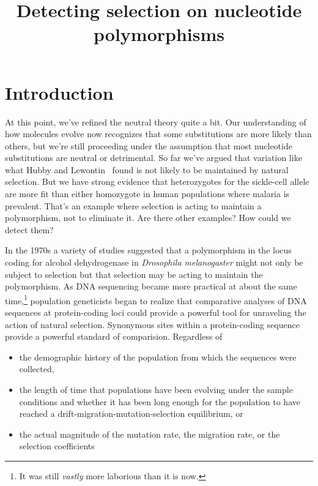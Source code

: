 \documentclass[12pt]{article}
\title{Detecting selection on nucleotide polymorphisms}
\begin{document}
\maketitle

\thispagestyle{first}

\section*{Introduction}

At this point, we've refined the neutral theory quite a bit. Our
understanding of how molecules evolve now recognizes that some
substitutions are more likely than others, but we're still proceeding
under the assumption that most nucleotide substitutions are neutral or
detrimental. So far we've argued that variation like what Hubby and
Lewontin~\cite{Hubby-Lewontin66,Lewontin-Hubby66} found is not likely
to be maintained by natural selection. But we have strong evidence
that heterozygotes for the sickle-cell allele are more fit than either
homozygote in human populations where malaria is prevalent. That's an
example where selection is acting to maintain a polymorphism, not to
eliminate it. Are there other examples? How could we detect them?

In the 1970s a variety of studies suggested that a polymorphism in the
locus coding for alcohol dehydrogenase in {\it Drosophila
  melanogaster\/} might not only be subject to selection but that
selection may be acting to maintain the polymorphism. As DNA
sequencing became more practical at about the same time,\footnote{It
  was still {\it vastly\/} more laborious than it is now.} population
geneticists began to realize that comparative analyses of DNA
sequences at protein-coding loci could provide a powerful tool for
unraveling the action of natural selection. Synonymous sites within a
protein-coding sequence provide a powerful standard of
comparision. Regardless of

\begin{itemize}

\item the demographic history of the population from which the
  sequences were collected,

\item the length of time that populations have been evolving under the
  sample conditions and whether it has been long enough for the
  population to have reached a drift-migration-mutation-selection
  equilibrium, or

\item the actual magnitude of the mutation rate, the migration rate,
  or the selection coefficients

\end{itemize}
\end{document}
